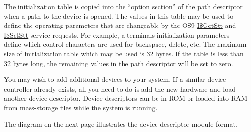 \documentclass[
]{article}
\begin{document}
The initialization table is copied into the ``option section'' of the
path descriptor when a path to the device is opened. The values in this
table may be used to define the operating parameters that are changeable
by the OS9 \hyperref[i.getstt]{I\$GetStt} and
\hyperref[i.setstt]{I\$SetStt} service requests. For example, a
terminal\textquotesingle s initialization parameters define which
control characters are used for backspace, delete, etc. The maximum size
of initialization table which may be used is 32 bytes. If the table is
less than 32 bytes long, the remaining values in the path descriptor
will be set to zero.

You may wish to add additional devices to your system. If a similar
device controller already exists, all you need to do is add the new
hardware and load another device descriptor. Device descriptors can be
in ROM or loaded into RAM from mass-storage files while the system is
running.

The diagram on the next page illustrates the device descriptor module
format.
\end{document}
